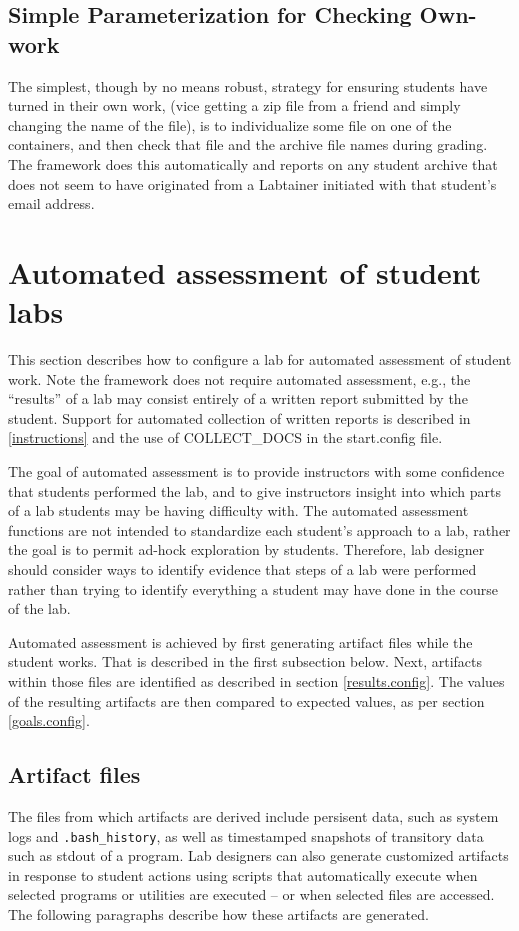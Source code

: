 \documentclass[12pt]{article}
\begin{document}
\subsection{Simple Parameterization for Checking Own-work}
The simplest, though by no means robust, strategy for ensuring students
have turned in their own work, (vice getting a zip file from a friend and simply
changing the name of the file), is to individualize some file on one of the containers,
and then check that file and the archive file names during grading.  The framework does
this automatically and reports on any student archive that does not seem to have
originated from a Labtainer initiated with that student's email address.


\section{Automated assessment of student labs}
\label{assessment}
This section describes how to configure a lab for automated assessment of student work.
Note the framework does not require automated assessment, e.g., the
``results'' of a lab may consist entirely of a written report submitted by the student.
Support for automated collection of written reports is described in \ref{instructions}
and the use of COLLECT\_DOCS in the start.config file.

The goal of automated assessment is to provide instructors with some confidence that 
students performed the lab, and to give instructors insight into which parts
of a lab students may be having difficulty with.  The automated assessment functions are
not intended to standardize each student's approach to a lab, rather the goal is to permit
ad-hock exploration by students.  Therefore, lab designer should consider ways to identify
evidence that steps of a lab were performed rather than trying to identify everything a student
may have done in the course of the lab.

Automated assessment is achieved by first generating artifact files while the student works.  That
is described in the first subsection below.  Next, artifacts within those files are identified
as described in section \ref{results.config}.  The values of the resulting artifacts are then
compared to expected values, as per section \ref{goals.config}.

\subsection{Artifact files}
\label{artifact files}
The files from which artifacts are derived include persisent data, such as system logs and 
{\tt .bash\_history}, as well as 
timestamped snapshots of transitory data such as stdout of a program.  Lab designers can also generate
customized artifacts in response to student actions using scripts that automatically execute when selected
programs or utilities are executed -- or when selected files are accessed.   The following paragraphs
describe how these artifacts are generated.
\end{document}
